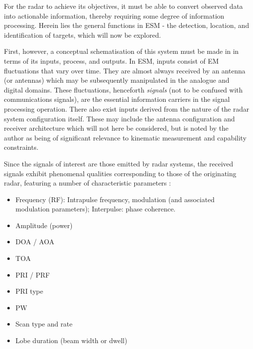 


For the radar to achieve its objectives, it must be able to convert observed data into actionable information, thereby requiring some degree of information processing. 
Herein lies the general functions in \ac{ESM} - the detection, location, and identification of targets, which will now be explored. %

First, however, a conceptual schematisation of this system must be made in in terms of its inputs, process, and outputs. In \ac{ESM}, inputs consist of EM fluctuations that vary over time. They are almost always received by an antenna (or antennas) which may be subsequently manipulated in the analogue and digital domains. These fluctuations, henceforth \textit{signals} (not to be confused with communications signals), are the essential information carriers in the signal processing operation. There also exist inputs derived from the nature of the radar system configuration itself. These may include the antenna configuration and receiver architecture which will not here be considered, but is noted by the author as being of significant relevance to kinematic measurement and capability constraints.

Since the signals of interest are those emitted by radar systems, the received signals exhibit phenomenal qualities corresponding to those of the originating radar, featuring a number of characteristic parameters \cite[sect. 5-8.1]{avionics_department_electronic_2013}: 
\begin{itemize}
    \item Frequency (\ac{RF}): Intrapulse frequency, modulation (and associated modulation parameters); Interpulse: phase coherence.
    \item Amplitude (power)
    \item \ac{DOA} / \ac{AOA}
    \item \ac{TOA}
    \item \ac{PRI} / \ac{PRF}
    \item \ac{PRI} type
    \item \ac{PW}
    \item Scan type and rate
    \item Lobe duration (beam width or dwell)
\end{itemize}

